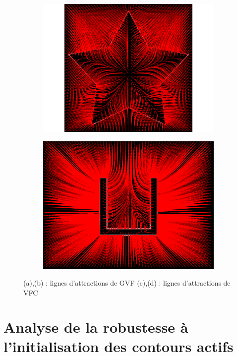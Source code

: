 \begin{appendices}
\begin{figure}[H]
\begin{subfigure}[c]{0.4\linewidth}
\includegraphics[width=\textwidth]{Chapters/Images/Conc/vfcsstream}
\caption{}
\end{subfigure}
\begin{subfigure}[c]{0.4\linewidth}
\centering
\includegraphics[width=\textwidth]{Chapters/Images/Conc/vfcsqstream}
\caption{}
\end{subfigure}
\caption{(a),(b) : lignes d'attractions de GVF (c),(d) : lignes d'attractions de VFC}
\end{figure}

\section{Analyse de la robustesse à l'initialisation des contours actifs}
\label{ann_init_results}


\end{appendices}
